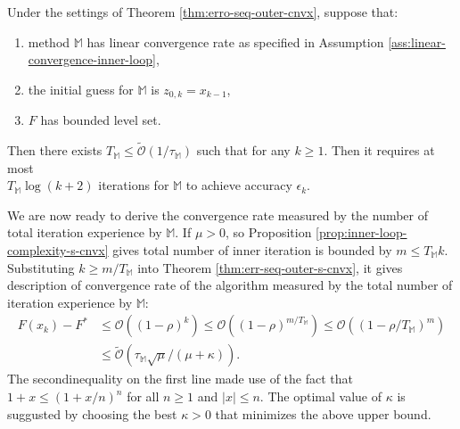 \documentclass[12pt]{article}
\begin{document}
            \begin{proposition}\label{prop:inner-loop-complexity-cnvx}
                Under the settings of Theorem \ref{thm:erro-seq-outer-cnvx}, suppose that:
                \begin{enumerate}
                    \item method $\mathbb M$ has linear convergence rate as specified in Assumption \ref{ass:linear-convergence-inner-loop}, 
                    \item the initial guess for $\mathbb M$ is $z_{0, k} = x_{k - 1}$, 
                    \item $F$ has bounded level set.
                \end{enumerate}
                Then there exists $T_{\mathbb M} \le \widetilde{\mathcal O}(1 / \tau_{\mathbb M})$ such that for any $k \ge 1$. 
                Then it requires at most\\ $T_{\mathbb M}\log(k + 2)$ iterations for $\mathbb M$ to achieve accuracy $\epsilon_k$.    
            \end{proposition}
            We are now ready to derive the convergence rate measured by the number of total iteration experience by $\mathbb M$. 
            If $\mu > 0$, so Proposition \ref{prop:inner-loop-complexity-s-cnvx} gives total number of inner iteration is bounded by $m \le T_{\mathbb M}k$. 
            Substituting $k \ge m/T_{\mathbb M}$ into Theorem \ref{thm:err-seq-outer-s-cnvx}, it gives description of convergence rate of the algorithm measured by the total number of iteration experience by $\mathbb M$: 
            \begin{align*}
                F(x_k) - F^* &\le \mathcal O \left(
                    (1 - \rho)^k 
                \right) \le 
                \mathcal O \left(
                    (1 - \rho)^{m/ T_{\mathbb M}}
                \right) \le 
                \mathcal O\left(
                    \left(1 - \rho/T_{\mathbb M}\right)^{m}
                \right)
                \\
                &\le \widetilde{\mathcal O}\left(
                    \tau_{\mathbb M}\sqrt{\mu}/(\mu + \kappa)
                \right). 
            \end{align*}
            The secondinequality on the first line made use of the fact that $1 + x \le (1 + x/n)^n$ for all $n \ge 1$ and $|x| \le n$. 
            The optimal value of $\kappa$ is suggusted by choosing the best $\kappa > 0$ that minimizes the above upper bound. 
\end{document}
